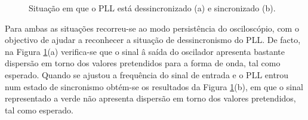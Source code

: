 \documentclass[11pt]{article}
\numberwithin{equation}{section}
\begin{document}
{\begin{figure}[H]
	\centering
	\hspace{8mm}
	\vspace{-0.8em}
	\caption{Situação em que o PLL está dessincronizado (a) e sincronizado (b).}
	\label{fig:PLL}
	\vspace{-0.8em}
\end{figure}

Para ambas as situações recorreu-se ao modo persistência do osciloscópio, com o objectivo de ajudar a reconhecer a situação de dessincronismo do PLL. De facto, na Figura \ref{fig:PLL}(a) verifica-se que o sinal â saída do oscilador apresenta bastante dispersão em torno dos valores pretendidos para a forma de onda, tal como esperado. Quando se ajustou a frequência do sinal de entrada e o PLL entrou num estado de sincronismo obtém-se os resultados da Figura \ref{fig:PLL}(b), em que o sinal representado a verde não apresenta dispersão em torno dos valores pretendidos, tal como esperado.

}
\end{document}
